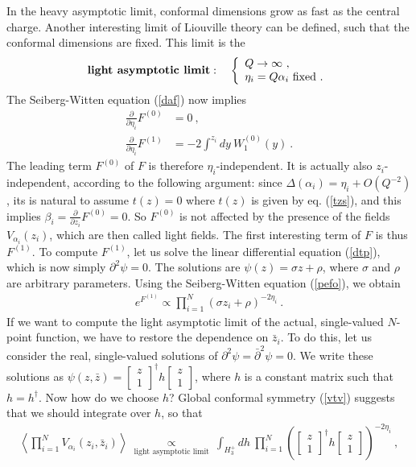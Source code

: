 \documentclass[12pt,a4paper,notitlepage]{report}
\newcommand \la {\left\langle}
\newcommand \ra {\right\rangle}
\newcommand \bla {\left\{\begin{array}{l} }
\newcommand \ela {\end{array}\right. }
\newcommand \p {\partial}
\newcommand \pp[1] {{\frac{\p}{\p #1}}}
\numberwithin{equation}{section}
\theoremstyle{break}
\begin{document}
In the heavy asymptotic limit, conformal dimensions grow as fast as the central charge. Another interesting limit of Liouville theory can be defined, such that the conformal dimensions are fixed. This limit is the
\begin{align}
 \textbf{\boldmath light\ asymptotic\ limit}\index{light\ asymptotic\ limit}: \quad \bla Q \rightarrow \infty \ ,\\ \eta_i=Q\alpha_i\ \text{fixed}\ .\ela 
\end{align}
 The Seiberg-Witten equation (\ref{daf}) now implies 
\begin{align}
 \pp{\eta_i} F^{(0)} & = 0 \ ,
\\ 
\pp{\eta_i} F^{(1)} & = -2\int^{z_i} dy\  W_1^{(0)}(y) \ .
\label{pefo}
\end{align}
The leading term $F^{(0)}$ of $F$ is therefore $\eta_i$-independent. It is actually also $z_i$-independent, according to the following argument: since $\Delta(\alpha_i)=\eta_i + O(Q^{-2})$, its is natural to assume $t(z)=0$ where $t(z)$ is given by eq. (\ref{tzs}), and this implies $\beta_i=\pp{z_i} F^{(0)}=0$.
So $F^{(0)}$ is not affected by the presence of the fields $V_{\alpha_i}(z_i)$, which are then called light fields. The first interesting term of $F$ is thus $F^{(1)}$. To compute $F^{(1)}$, let us solve the linear differential equation (\ref{dtp}), which is now simply $\p^2 \psi=0$. The solutions are $\psi(z) = \sigma z + \rho$, where $\sigma$ and $\rho$ are arbitrary parameters. Using the Seiberg-Witten equation (\ref{pefo}), we obtain
\begin{align}
 e^{F^{(1)}} \propto \prod_{i=1}^N (\sigma z_i + \rho)^{-2\eta_i} \ .
\end{align}
If we want to compute the light asymptotic limit of the actual, single-valued $N$-point function, we have to restore the dependence on $\bar{z}_i$. To do this, let us consider the real, single-valued solutions of $\p^2 \psi = \bar{\p}^2\psi=0$. We write these solutions as $\psi(z,\bar{z}) = \left[\begin{smallmatrix} z \\ 1 \end{smallmatrix}\right]^\dagger h \left[\begin{smallmatrix} z \\ 1 \end{smallmatrix}\right]$, where $h$ is a constant matrix such that $h=h^\dagger$. Now how do we choose $h$? Global conformal symmetry (\ref{vtv}) suggests that we should integrate over $h$, so that
\begin{align}
\la\prod_{i=1}^N V_{\alpha_i}(z_i,\bar{z}_i)\ra\ \underset{\text{light\ asymptotic\ limit}}{\propto}\ \int_{H^+_3} dh\ \prod_{i=1}^N \left( \left[\begin{smallmatrix} z \\ 1 \end{smallmatrix}\right]^\dagger h \left[\begin{smallmatrix} z \\ 1 \end{smallmatrix}\right] \right)^{-2\eta_i}\ ,
\label{zih}
\end{align}
\end{document}
